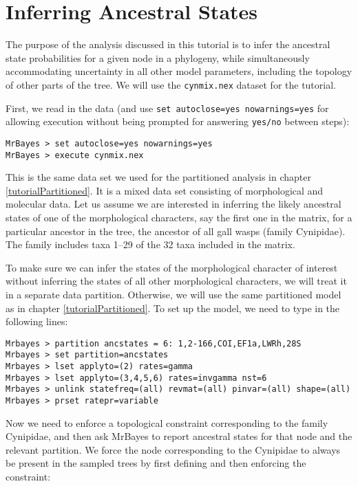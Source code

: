\documentclass[12pt]{book}
\begin{document}
\section{Inferring Ancestral States}

The purpose of the analysis discussed in this tutorial is to infer the ancestral state
probabilities for a given node in a phylogeny, while simultaneously accommodating uncertainty in
all other model parameters, including the topology of other parts of the tree. We will use the
\texttt{cynmix.nex} dataset for the tutorial.

First, we read in the data (and use \texttt{set autoclose=yes nowarnings=yes} for allowing
execution without being prompted for answering \texttt{yes/no} between steps):

\begin{Verbatim}
MrBayes > set autoclose=yes nowarnings=yes
MrBayes > execute cynmix.nex
\end{Verbatim}

This is the same data set we used for the partitioned analysis in chapter
\ref{tutorialPartitioned}. It is a mixed data set consisting of morphological and molecular data.
Let us assume we are interested in inferring the likely ancestral states of one of the
morphological characters, say the first one in the matrix, for a particular ancestor in the tree,
the ancestor of all gall wasps (family Cynipidae). The family includes taxa 1--29 of the 32 taxa
included in the matrix.

To make sure we can infer the states of the morphological character of interest without inferring
the states of all other morphological characters, we will treat it in a separate data partition.
Otherwise, we will use the same partitioned model as in chapter \ref{tutorialPartitioned}. To set
up the model, we need to type in the following lines:

\begin{Verbatim}
Mrbayes > partition ancstates = 6: 1,2-166,COI,EF1a,LWRh,28S
Mrbayes > set partition=ancstates
Mrbayes > lset applyto=(2) rates=gamma
Mrbayes > lset applyto=(3,4,5,6) rates=invgamma nst=6
Mrbayes > unlink statefreq=(all) revmat=(all) pinvar=(all) shape=(all)
Mrbayes > prset ratepr=variable
\end{Verbatim}

Now we need to enforce a topological constraint corresponding to the family Cynipidae, and then ask
MrBayes to report ancestral states for that node and the relevant partition. We force the node
corresponding to the Cynipidae to always be present in the sampled trees by first defining and then
enforcing the constraint:
\end{document}

